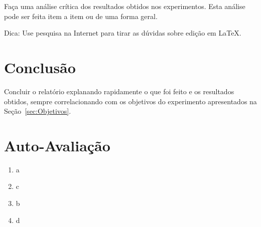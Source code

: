 \documentclass[12pt]{article}
\begin{document}
Faça uma análise crítica dos resultados obtidos nos experimentos. Esta análise pode ser feita item a item ou de uma forma geral.

Dica: Use pesquisa na Internet para tirar as dúvidas sobre edição em \LaTeX .

\section{Conclusão}
\label{sec:Conclusao}

Concluir o relatório explanando rapidamente o que foi feito e os resultados obtidos, sempre correlacionando com os objetivos do experimento apresentados na Seção~\ref{sec:Objetivos}. 





\newpage 
\section*{Auto-Avaliação}

\begin{enumerate}
    \item a
    \item c
    \item b
    \item d
\end{enumerate}
\end{document}
